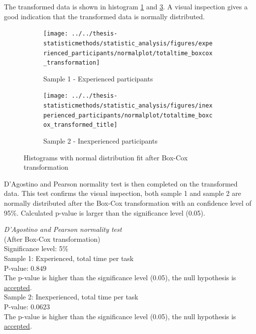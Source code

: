 The transformed data is shown in histogram \ref{fig:totaltimeboxcoxtransformation_experienced} and \ref{fig:totaltimeboxcoxtransformedtitle_inexperienced}. A visual inspection gives a good indication that the transformed data is normally distributed.

\begin{figure}[H]
	\centering
	\begin{subfigure}[b]{0.48\textwidth}
		\centering
		\texttt{[image: ../../thesis-statisticmethods/statistic\_analysis/figures/experienced\_participants/normalplot/totaltime\_boxcox\_transformation]}
		\caption[Experienced, Box-Cox]{Sample 1 - Experienced participants}
		\label{fig:totaltimeboxcoxtransformation_experienced}
	\end{subfigure}
	\begin{subfigure}[b]{0.48\textwidth}
		\centering
		\texttt{[image: ../../thesis-statisticmethods/statistic\_analysis/figures/inexperienced\_participants/normalplot/totaltime\_boxcox\_transformed\_title]}
		\caption[Inexperienced, Box-Cox]{Sample 2 - Inexperienced participants}
		\label{fig:totaltimeboxcoxtransformedtitle_inexperienced}
	\end{subfigure}
\caption{Histograms with normal distribution fit after Box-Cox transformation}
\end{figure}

D'Agostino and Pearson normality test is then completed on the transformed data. This test confirms the visual inspection, both sample 1 and sample 2 are normally distributed after the Box-Cox transformation with an confidence level of 95\%. Calculated p-value is larger than the significance level (0.05). \\[0.5cm] 

\begin{center}
	\begin{tcolorbox}[box align=center,width=\textwidth-5cm]
		\centering
		\textit{D'Agostino and Pearson normality test}\\
		(After Box-Cox transformation) \\
		Significance level: 5\%  \\[0.5cm]
		
		Sample 1: Experienced, total time per task\\
		P-value: $0.849$\\
		The p-value is higher than the significance level (0.05), the null hypothesis is \underline{accepted}. \\[0.5cm]
		
		Sample 2: Inexperienced, total time per task \\ %
		P-value: $0.0623$ \\
		The p-value is higher than the significance level (0.05), the null hypothesis is \underline{accepted}. \\[0.5cm]
	\end{tcolorbox}
\end{center}

